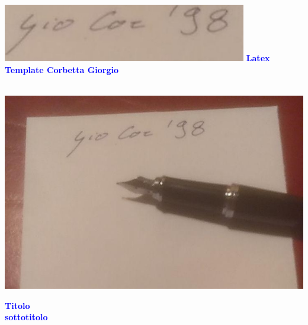 






\begin{titlepage}


{\begin{table}[t!]
{\includegraphics[width=0.8\textwidth]{./../img/struct/logo}}
\newline
\textcolor{Blue}{\textbf{\Large{Latex Template} \newline \small{Corbetta Giorgio}}}
\end{table}}~ \\ [1cm]


\includegraphics[width=1\textwidth]{./../img/struct/project}\\ [1cm]

\begin{flushleft}

{\textcolor{Blue}{\textbf{\Huge{Titolo}}}} \\ [1cm]

\textcolor{Blue}{\textbf{\Large{sottotitolo}}}

\end{flushleft}

\end{titlepage}

